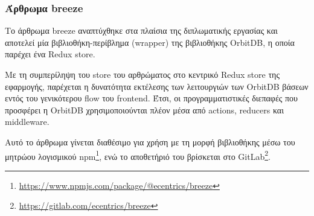 \subsubsection{Άρθρωμα breeze} \label{subsubsection:4-3-1-5-breeze-module}

Το άρθρωμα breeze αναπτύχθηκε στα πλαίσια της διπλωματικής εργασίας και αποτελεί μία βιβλιοθήκη-περίβλημα (wrapper) της βιβλιοθήκης OrbitDB, η οποία παρέχει ένα Redux store. 

Με τη συμπερίληψη του store του αρθρώματος στο κεντρικό Redux store της εφαρμογής, παρέχεται η δυνατότητα εκτέλεσης των λειτουργιών των OrbitDB βάσεων εντός του γενικότερου flow του frontend. Έτσι, οι προγραμματιστικές διεπαφές που προσφέρει η OrbitDB χρησιμοποιούνται πλέον μέσα από actions, reducers και middleware.

Αυτό το άρθρωμα γίνεται διαθέσιμο για χρήση με τη μορφή βιβλιοθήκης μέσω του μητρώου λογισμικού npm\footnote{\url{https://www.npmjs.com/package/@ecentrics/breeze}}, ενώ το αποθετήριό του βρίσκεται στο GitLab\footnote{\url{https://gitlab.com/ecentrics/breeze}}.
